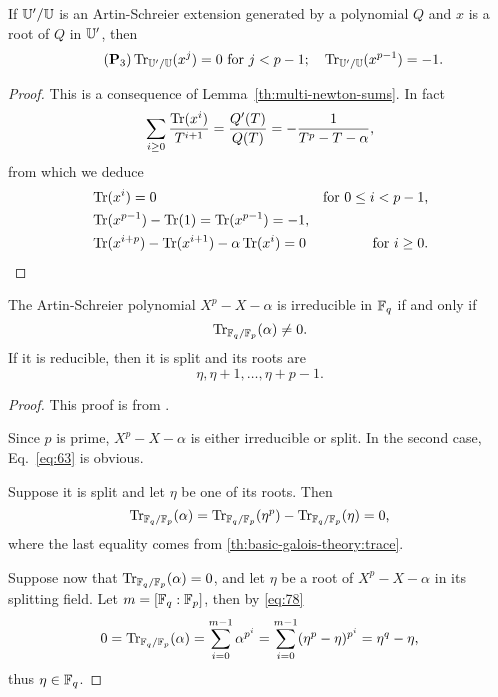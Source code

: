 \begin{proposition}
  \label{th:p3}
  If $\mathbb{U}'/\mathbb{U}$ is an Artin-Schreier extension generated by a polynomial
  $Q$ and $x$ is a root of $Q$ in $\mathbb{U}'$, then
\begin{equation}
  \tag{$\mathbf{P}_3$}\label{eq:pd} \Tr_{\U'/\U}(x^j) = 0~ \text{for}~j
  <p-1; \quad \Tr_{\U'/\U}(x^{p-1}) = -1\text{.}
\end{equation}
\end{proposition}
\begin{proof}
  This is a consequence of Lemma~\ref{th:multi-newton-sums}. In fact
  \begin{equation}
    \sum_{i\ge0} \frac{\operatorname{Tr}(x^{i})}{T^{i+1}} = \frac{Q'(T)}{Q(T)} =
    -\frac{1}{T^p-T-\alpha}
    \text{,}
  \end{equation}
  from which we deduce
  \begin{align}
    \label{eq:61}
    &\operatorname{Tr}(x^i) = 0 &\text{for $0\le i<p-1$,}\\
    &\operatorname{Tr}(x^{p-1}) - \operatorname{Tr}(1) = \operatorname{Tr}(x^{p-1}) = -1\text{,}\\
    &\operatorname{Tr}(x^{i+p}) - \operatorname{Tr}(x^{i+1}) - \alpha\operatorname{Tr}(x^{i}) = 0 &\text{for $i\ge 0$.}
  \end{align}
\end{proof}

\begin{proposition}
  \label{th:artin-schreier}
  The Artin-Schreier polynomial $X^p-X-\alpha$ is irreducible in $\mathbb{F}_q$
  if and only if
  \begin{equation}
    \label{eq:62}
    \operatorname{Tr}_{\mathbb{F}_q/\mathbb{F}_p}(\alpha) \ne 0
    \text{.}
  \end{equation}
  If it is reducible, then it is split and its roots are 
  \begin{equation}
    \label{eq:63}
    \eta, \eta+1, \ldots, \eta + p -1
    \text{.}
  \end{equation}
\end{proposition}
\begin{proof}
  This proof is from \cite[Chapter~2]{lidl+niederreiter:2}.

  Since $p$ is prime, $X^p-X-\alpha$ is either irreducible or
  split. In the second case, Eq.~\eqref{eq:63} is obvious.

  Suppose it is split and let $\eta$ be one of its roots. Then
  \begin{equation}
    \operatorname{Tr}_{\mathbb{F}_q/\mathbb{F}_p}(\alpha) = \operatorname{Tr}_{\mathbb{F}_q/\mathbb{F}_p}(\eta^p) - \operatorname{Tr}_{\mathbb{F}_q/\mathbb{F}_p}(\eta) = 0
    \text{,}
  \end{equation}
  where the last equality comes from
  \ref{th:basic-galois-theory:trace}.

  Suppose now that $\operatorname{Tr}_{\mathbb{F}_q/\mathbb{F}_p}(\alpha)=0$, and let $\eta$ be a
  root of $X^p-X-\alpha$ in its splitting field. Let $m=[\mathbb{F}_q:\mathbb{F}_p]$,
  then by \eqref{eq:78}
  \begin{equation}
    0=\operatorname{Tr}_{\mathbb{F}_q/\mathbb{F}_p}(\alpha) = \sum_{i=0}^{m-1}\alpha^{p^i} =
    \sum_{i=0}^{m-1}(\eta^p-\eta)^{p^i} =\eta^{q}-\eta
    \text{,}
  \end{equation}
  thus $\eta\in\mathbb{F}_q$.
\end{proof}

